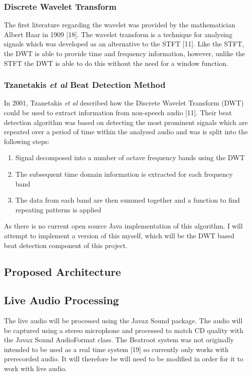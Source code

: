 \documentclass[a4paper, 11pt]{article}
\begin{document}
\subsubsection{Discrete Wavelet Transform}
The first literature regarding the wavelet was provided by the mathematician Albert Haar in 1909 [18]. The wavelet transform is a technique for analysing signals which was developed as an alternative to the STFT [11]. Like the STFT, the DWT is able to provide time and frequency information, however, unlike the STFT the DWT is able to do this without the need for a window function. 

\subsubsection{Tzanetakis \textit{et al} Beat Detection Method}
In 2001, Tzanetakis \textit{et al} described how the Discrete Wavelet Transform (DWT) could be used to extract information from non-speech audio [11]. Their beat detection algorithm was based on detecting the most prominent signals which are repeated over a period of time within the analysed audio and was is split into the following steps: 

\begin{enumerate}
\item Signal decomposed into a number of octave frequency bands using the DWT
\item The subsequent time domain information is extracted for each frequency band
\item The data from each band are then summed together and a function to find repeating patterns is applied
\end{enumerate}

As there is no current open source Java implementation of this algorithm. I will attempt to implement a version of this myself, which will be the DWT based beat detection component of this project.





\subsection{Proposed Architecture}




\subsection{Live Audio Processing}
The live audio will be processed using the Javax Sound package. The audio will be captured using a stereo microphone and processed to match CD quality with the Javax Sound AudioFormat class. The Beatroot system was not originally intended to be used as a real time system [19] so currently only works with prerecorded audio. It will therefore be will need to be modified in order for it to work with live audio. 
\end{document}
